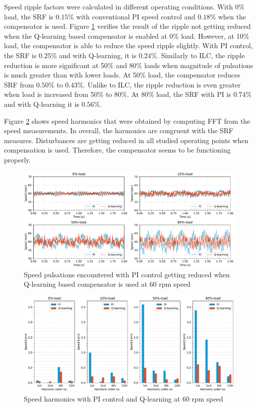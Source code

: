 Speed ripple factors were calculated in different operating conditions. With 0\% load, the SRF is $0.15\%$ with conventional PI speed control and $0.18\%$ when the compensator is used. Figure \ref{Fig:experimentl-qlr-speed} verifies the result of the ripple not getting reduced when the Q-learning based compensator is enabled at 0\% load. However, at 10\% load, the compensator is able to reduce the speed ripple slightly. With PI control, the SRF is $0.25\%$ and with Q-learning, it is $0.24\%$. Similarly to ILC, the ripple reduction is more significant at 50\% and 80\% loads when magnitude of pulsations is much greater than with lower loads. At 50\% load, the compensator reduces SRF from $0.50\%$ to $0.43\%$. Unlike to ILC, the ripple reduction is even greater when load is increased from 50\% to 80\%. At 80\% load, the SRF with PI is $0.74\%$ and with Q-learning it is $0.56\%$.

Figure \ref{Fig:experimentl-qlr-harmonics-speed} shows speed harmonics that were obtained by computing FFT from the speed measurements. In overall, the harmonics are congruent with the SRF measures. Disturbances are getting reduced in all studied operating points when compensation is used. Therefore, the compensator seems to be functioning properly.
\begin{figure}[p] 
    \centering
    \includegraphics[width=1.0\linewidth]{images/PI-QLR-comparison-time-domain.pdf} 
    \caption{Speed pulsations encountered with PI control getting reduced when Q-learning based compensator is used at 60 rpm speed}
    \label{Fig:experimentl-qlr-speed}
\end{figure}

\begin{figure}[p]
    \centering
    \includegraphics[width=1.0\linewidth]{images/PI-QLR-comparison-harmonics.pdf} 
    \caption{Speed harmonics with PI control and Q-learning at $60$ rpm speed}
    \label{Fig:experimentl-qlr-harmonics-speed}
\end{figure}

